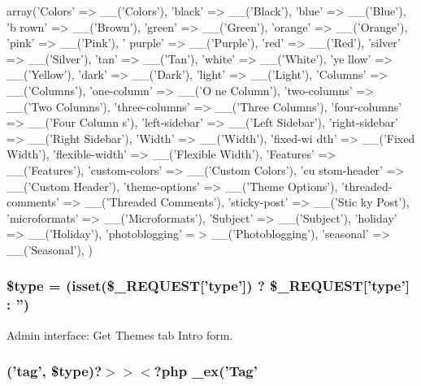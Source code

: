 \begin{DoxyCode}
 array('Colors' => __('Colors'), 'black' => __('Black'), 'blue' => __('Blue'), 'b
      rown' => __('Brown'),
        'green' => __('Green'), 'orange' => __('Orange'), 'pink' => __('Pink'), '
      purple' => __('Purple'), 'red' => __('Red'),
        'silver' => __('Silver'), 'tan' => __('Tan'), 'white' => __('White'), 'ye
      llow' => __('Yellow'), 'dark' => __('Dark'),
        'light' => __('Light'), 'Columns' => __('Columns'), 'one-column' => __('O
      ne Column'), 'two-columns' => __('Two Columns'),
        'three-columns' => __('Three Columns'), 'four-columns' => __('Four Column
      s'), 'left-sidebar' => __('Left Sidebar'),
        'right-sidebar' => __('Right Sidebar'), 'Width' => __('Width'), 'fixed-wi
      dth' => __('Fixed Width'), 'flexible-width' => __('Flexible Width'),
        'Features' => __('Features'), 'custom-colors' => __('Custom Colors'), 'cu
      stom-header' => __('Custom Header'), 'theme-options' => __('Theme Options'),
        'threaded-comments' => __('Threaded Comments'), 'sticky-post' => __('Stic
      ky Post'), 'microformats' => __('Microformats'),
        'Subject' => __('Subject'), 'holiday' => __('Holiday'), 'photoblogging' =
      > __('Photoblogging'), 'seasonal' => __('Seasonal'),
    )
\end{DoxyCode}
\hypertarget{themes__intro_8php_a9a4a6fba2208984cabb3afacadf33919}{
\subsubsection[{\$type}]{\setlength{\rightskip}{0pt plus 5cm}\$type = (isset(\$\_\-REQUEST\mbox{[}'type'\mbox{]}) ? \$\_\-REQUEST\mbox{[}'type'\mbox{]} : '')}}
\label{d9/dc8/themes__intro_8php_a9a4a6fba2208984cabb3afacadf33919}


Admin interface: Get Themes tab Intro form. 

\hypertarget{themes__intro_8php_a7b50ba9cdd56f1b15b8378182e0c5498}{
\subsubsection[{selected}]{('tag', \$type)?$>$$>$$<$?php \_\-ex('Tag'}}
\label{d9/dc8/themes__intro_8php_a7b50ba9cdd56f1b15b8378182e0c5498}
